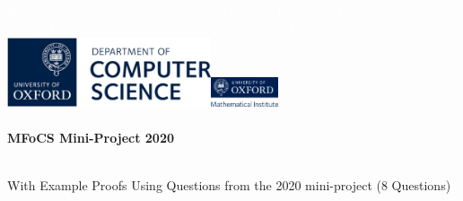 \begin{titlepage}


\TITLEBOX

\begin{center}



\sffamily\textsc{\HUGE{\textcolor{white}{Foundations of Computer Science}}} \par

\sffamily\textsc{{\textcolor{white}{Selection of Notes to Accompany the Course Taught by Konstantin Ardakov and M.J. Sipser's Introduction to the Theory of Computation}}}
\\[4cm]





\includegraphics[width=0.45\textwidth]{media/unilogo.png}\makebox[1.5cm]{}\includegraphics[width=0.15\textwidth]{media/faculty.png}~\\[1.5cm]



\HRule \\[0.4cm]
{
 \huge \bfseries \sffamily MFoCS Mini-Project 2020  \\[0.4cm] 
}

\HRule \\[0.4cm] 

\normalfont \large \sffamily With Example Proofs Using Questions from the 2020 mini-project (8 Questions)\\[2.5cm]


\end{center}
\end{titlepage}
